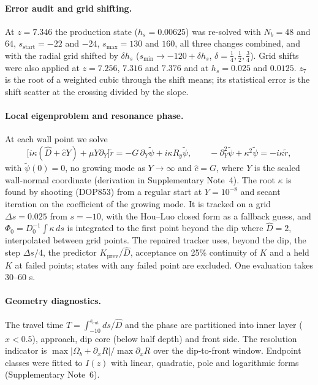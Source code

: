 \documentclass[11pt]{article}
\newcommand{\Dh}{\hat D}
\newcommand{\sstart}{s_{\mathrm{start}}}
\newcommand{\smax}{s_{\max}}
\begin{document}
\paragraph{Error audit and grid shifting.} At $z=7.346$ the production state ($h_s=0.00625$) was re-solved with
$N_b=48$ and $64$, $\sstart=-22$ and $-24$, $\smax=130$ and $160$, all three changes combined, and with the radial grid
shifted by $\delta h_s$ ($s_{\min}\to-120+\delta h_s$, $\delta=\tfrac14,\tfrac12,\tfrac34$). Grid shifts were also
applied at $z=7.256$, $7.316$ and $7.376$ and at $h_s=0.025$ and $0.0125$. $z_7$ is the root of a weighted cubic
through the shift means; its statistical error is the shift scatter at the crossing divided by the slope.

\paragraph{Local eigenproblem and resonance phase.} At each wall point we solve
\begin{equation}
\bigl[i\kappa(\Dh+\hat cY)+\mu Y\partial_Y\bigr]\tilde r=-G\,\partial_Y\tilde\psi+i\kappa R_y\tilde\psi ,\qquad
-\partial_Y^2\tilde\psi+\kappa^2\tilde\psi=-i\kappa\tilde r ,
\end{equation}
with $\tilde\psi(0)=0$, no growing mode as $Y\to\infty$ and $\hat c=G$, where $Y$ is the scaled wall-normal
coordinate (derivation in Supplementary Note~4). The root $\kappa$ is found by shooting (DOP853\cite{hairer1993}) from
a regular start at $Y=10^{-8}$ and secant iteration on the coefficient of the growing mode. It is tracked on a grid
$\Delta s=0.025$ from $s=-10$, with the Hou--Luo closed form as a fallback guess, and $\Phi_0=D_0^{-1}\int\kappa\,ds$
is integrated to the first point beyond the dip where $\Dh=2$, interpolated between grid points. The repaired tracker
uses, beyond the dip, the step $\Delta s/4$, the predictor $K_{\mathrm{prev}}/\Dh$, acceptance on 25\% continuity of
$K$ and a held $K$ at failed points; states with any failed point are excluded. One evaluation takes 30--60 s.

\paragraph{Geometry diagnostics.} The travel time $T=\int_{-10}^{s_{\mathrm{cut}}}ds/\Dh$ and the phase are
partitioned into inner layer ($x<0.5$), approach, dip core (below half depth) and front side. The resolution indicator
is $\max|\Omega_b+\partial_xR|/\max\partial_xR$ over the dip-to-front window. Endpoint classes were fitted to $I(z)$
with linear, quadratic, pole and logarithmic forms (Supplementary Note~6).
\end{document}
